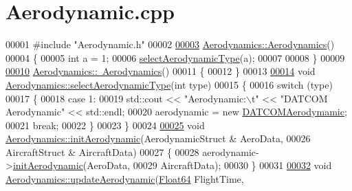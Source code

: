 \hypertarget{_aerodynamic_8cpp_source}{}\section{Aerodynamic.\+cpp}
\label{_aerodynamic_8cpp_source}

\begin{DoxyCode}
00001 \textcolor{preprocessor}{#include "Aerodynamic.h"}
00002 
\hyperlink{group___aerodynamic_a36c7ae850ce18605cdbf3ce1709d8e54}{00003} \hyperlink{group___aerodynamic_a36c7ae850ce18605cdbf3ce1709d8e54}{Aerodynamics::Aerodynamics}()
00004 \{
00005     \textcolor{keywordtype}{int} a = 1;
00006     \hyperlink{group___aerodynamic_a9aa3397e8b1d91ed237146a57bbe6bcf}{selectAerodynamicType}(a);
00007 
00008 \}
00009 
\hyperlink{group___aerodynamic_af0e048e0c80ec8334997b79b761fea60}{00010} \hyperlink{group___aerodynamic_af0e048e0c80ec8334997b79b761fea60}{Aerodynamics::~Aerodynamics}()
00011 \{
00012 \}
00013 
\hyperlink{group___aerodynamic_a9aa3397e8b1d91ed237146a57bbe6bcf}{00014} \textcolor{keywordtype}{void} \hyperlink{group___aerodynamic_a9aa3397e8b1d91ed237146a57bbe6bcf}{Aerodynamics::selectAerodynamicType}(\textcolor{keywordtype}{int} type)
00015 \{
00016     \textcolor{keywordflow}{switch} (type)
00017     \{
00018     \textcolor{keywordflow}{case} 1:
00019         std::cout << \textcolor{stringliteral}{"Aerodynamic:\(\backslash\)t"} << \textcolor{stringliteral}{"DATCOM Aerodynamic"} << std::endl;
00020         aerodynamic = \textcolor{keyword}{new} \hyperlink{group___aerodynamic_class_d_a_t_c_o_m_aerodymamic}{DATCOMAerodymamic};
00021         \textcolor{keywordflow}{break};
00022     \}
00023 \}
00024 
\hyperlink{group___aerodynamic_aa4fee96e5b485cac47b3bc2127a6d4e2}{00025} \textcolor{keywordtype}{void} \hyperlink{group___aerodynamic_aa4fee96e5b485cac47b3bc2127a6d4e2}{Aerodynamics::initAerodynamic}(AerodynamicStruct & AeroData,
00026                                    AircraftStruct & AircraftData)
00027 \{
00028     aerodynamic->\hyperlink{group___aerodynamic_a5ea58755a40507d217848efb151879c8}{initAerodynamic}(AeroData, 
00029                                  AircraftData);
00030 \}
00031 
\hyperlink{group___aerodynamic_adf6047b063022ff3b689e269d2b35863}{00032} \textcolor{keywordtype}{void} \hyperlink{group___aerodynamic_adf6047b063022ff3b689e269d2b35863}{Aerodynamics::updateAerodynamic}(\hyperlink{group___tools_ga3f1431cb9f76da10f59246d1d743dc2c}{Float64} FlightTime, 

\end{DoxyCode}
